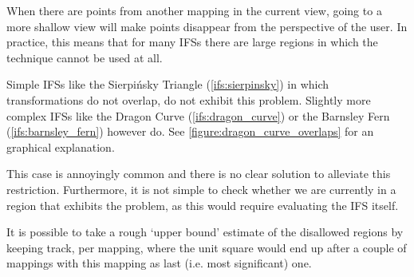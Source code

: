 \documentclass[11pt]{article}
\begin{document}
\begin{enumerate}
When there are points from another mapping in the current view, 
going to a more shallow view will make points disappear from the perspective of the user.
In practice, this means that for many IFSs there are large regions in which the technique cannot be used at all.

Simple IFSs like the Sierpińsky Triangle (\autoref{ifs:sierpinsky}) in which transformations
do not overlap, do not exhibit this problem. 
Slightly more complex IFSs like the Dragon Curve (\autoref{ifs:dragon_curve}) or the Barnsley Fern (\autoref{ifs:barnsley_fern}) however do.
See \autoref{figure:dragon_curve_overlaps} for an graphical explanation.


This case is annoyingly common and there is no clear solution to alleviate this restriction.
Furthermore, it is not simple to check whether we are currently in a region that exhibits the problem,
as this would require evaluating the IFS itself.

It is possible to take a rough `upper bound' estimate of the disallowed regions by keeping track, 
per mapping, where the unit square would end up after a couple of mappings with this mapping as last (i.e. most significant) one.



\end{enumerate}
\end{document}
